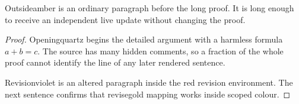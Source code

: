 \documentclass{article}
\newenvironment{REV}{\begingroup\color{red}}{\endgroup}
\begin{document}
Outsideamber is an ordinary paragraph before the long proof. It is long enough
to receive an independent live update without changing the proof.

\begin{proof}
Openingquartz begins the detailed argument with a harmless formula $a+b=c$.
The source has many hidden comments, so a fraction of the whole proof cannot
identify the line of any later rendered sentence.

\begin{REV}
Revisionviolet is an altered paragraph inside the red revision environment.
The next sentence confirms that revisegold mapping works inside scoped colour.
\end{REV}


\end{proof}
\end{document}
